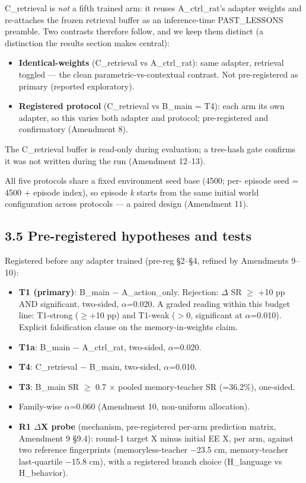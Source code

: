 C\_retrieval is \emph{not} a fifth trained arm: it reuses A\_ctrl\_rat's
adapter weights and re-attaches the frozen retrieval buffer as an
inference-time PAST\_LESSONS preamble. Two contrasts therefore follow,
and we keep them distinct (a distinction the results section makes
central):
\begin{itemize}
\item \textbf{Identical-weights} (C\_retrieval vs A\_ctrl\_rat): same adapter,
  retrieval toggled --- the clean parametric-vs-contextual contrast.
  Not pre-registered as primary (reported exploratory).
\item \textbf{Registered protocol} (C\_retrieval vs B\_main = T4): each arm its
  own adapter, so this varies both adapter and protocol; pre-registered
  and confirmatory (Amendment 8).
\end{itemize}

The C\_retrieval buffer is read-only during evaluation; a tree-hash gate
confirms it was not written during the run (Amendment 12--13).

All five protocols share a fixed environment seed base (4500; per-
episode seed = 4500 + episode index), so episode \emph{k} starts from the
same initial world configuration across protocols --- a paired design
(Amendment 11).

\subsection*{3.5 Pre-registered hypotheses and tests}

Registered before any adapter trained (pre-reg \S2--\S4, refined by
Amendments 9--10):

\begin{itemize}
\item \textbf{T1 (primary)}: B\_main $-$ A\_action\_only. Rejection: $\Delta$ SR $\ge$ +10 pp
  AND significant, two-sided, $\alpha$=0.020. A graded reading within this
  budget line: T1-strong ($\ge$+10 pp) and T1-weak ($>$0, significant at
  $\alpha$=0.010). Explicit falsification clause on the memory-in-weights
  claim.
\item \textbf{T1a}: B\_main $-$ A\_ctrl\_rat, two-sided, $\alpha$=0.020.
\item \textbf{T4}: C\_retrieval $-$ B\_main, two-sided, $\alpha$=0.010.
\item \textbf{T3}: B\_main SR $\ge$ 0.7 $\times$ pooled memory-teacher SR (=36.2\%),
  one-sided.
\item Family-wise $\alpha$=0.060 (Amendment 10, non-uniform allocation).
\item \textbf{R1 $\Delta$X probe} (mechanism, pre-registered per-arm prediction matrix,
  Amendment 9 \S9.4): round-1 target X minus initial EE X, per arm,
  against two reference fingerprints (memoryless-teacher $-$23.5 cm,
  memory-teacher last-quartile $-$15.8 cm), with a registered branch
  choice (H\_language vs H\_behavior).
\end{itemize}

